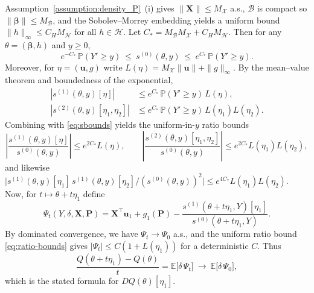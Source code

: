 \documentclass[11pt]{article}
\newcommand{\E}{\mathbb{E}}
\begin{document}
    Assumption~\ref{assumption:density_P}~(i) gives $\|\bm X\|\le M_{\mathcal X}$ a.s.,
    $\mathcal B$ is compact so $\|\bm\beta\|\le M_{\mathcal B}$, and the
    Sobolev--Morrey embedding yields a uniform bound $\|h\|_\infty\le C_H M_{\mathcal H}$
    for all $h\in\mathcal H$. Let $C_*=M_{\mathcal B}M_{\mathcal X}+C_HM_{\mathcal H}$.
    Then for any $\theta=(\bm\beta,h)$ and $y\ge0$,
    \begin{equation}\label{eq:sbounds}
    e^{-C_*}\,\mathbb P(Y'\!\ge y)\ \le\ s^{(0)}(\theta,y)\ \le\
    e^{C_*}\,\mathbb P(Y'\!\ge y).
    \end{equation}
    Moreover, for $\eta=(\bm u,g)$ write $L(\eta)=M_{\mathcal X}\|\bm u\|+\|g\|_\infty$.
    By the mean–value theorem and boundedness of the exponential,
    \begin{align*}
    |s^{(1)}(\theta,y)[\eta]|
    &\le e^{C_*}\,\mathbb P(Y'\!\ge y)\,L(\eta),\\
    |s^{(2)}(\theta,y)[\eta_1,\eta_2]|
    &\le e^{C_*}\,\mathbb P(Y'\!\ge y)\,L(\eta_1)L(\eta_2).
    \end{align*}
    Combining with \eqref{eq:sbounds} yields the uniform-in-$y$ ratio bounds
    \begin{equation}\label{eq:ratio-bounds}
    \left|\frac{s^{(1)}(\theta,y)[\eta]}{s^{(0)}(\theta,y)}\right|
    \le e^{2C_*}L(\eta),\qquad
    \left|\frac{s^{(2)}(\theta,y)[\eta_1,\eta_2]}{s^{(0)}(\theta,y)}\right|
    \le e^{2C_*}L(\eta_1)L(\eta_2),
    \end{equation}
    and likewise
    $\bigl|s^{(1)}(\theta,y)[\eta_1]\,s^{(1)}(\theta,y)[\eta_2]/(s^{(0)}(\theta,y))^2\bigr|
    \le e^{4C_*}L(\eta_1)L(\eta_2)$.
    Now, for $t\mapsto\theta+t\eta_1$ define
    \[
    \Psi_t(Y,\delta,\bm X,\bm P)
    =\bm X^{\!\top}\bm u_1+g_1(\bm P)
    -\frac{s^{(1)}(\theta+t\eta_1,Y)[\eta_1]}{s^{(0)}(\theta+t\eta_1,Y)}.
    \]
    By dominated convergence, we have
    $\Psi_t\to \Psi_0$ a.s., and the uniform ratio bound \eqref{eq:ratio-bounds}
    gives $|\Psi_t|\le C(1+L(\eta_1))$ for a deterministic $C$.
    Thus
    \[
    \frac{Q(\theta+t\eta_1)-Q(\theta)}{t}
    =\E\bigl[\delta\,\Psi_t\bigr]\ \longrightarrow\ \E\bigl[\delta\,\Psi_0\bigr],
    \]
    which is the stated formula for $DQ(\theta)[\eta_1]$.
    
\end{document}
